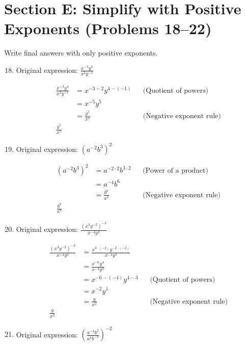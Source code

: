 \documentclass{article}
\begin{document}
\section*{Section E: Simplify with Positive Exponents (Problems 18--22)} 
Write final answers with only positive exponents.

\begin{enumerate}
\setcounter{enumi}{17}

\item
Original expression: \quad $\frac{x^{-3} y^4}{x^2 y^{-1}}$

\begin{align*}
\frac{x^{-3} y^4}{x^2 y^{-1}} &= x^{-3 - 2} y^{4 - (-1)} && \text{(Quotient of powers)} \\
&= x^{-5} y^{5} \\
&= \frac{y^{5}}{x^{5}} && \text{(Negative exponent rule)} \\
\boxed{\frac{y^{5}}{x^{5}}}
\end{align*}

\item
Original expression: \quad $(a^{-2} b^3)^2$

\begin{align*}
(a^{-2} b^3)^2 &= a^{-2 \cdot 2} b^{3 \cdot 2} && \text{(Power of a product)} \\
&= a^{-4} b^{6} \\
&= \frac{b^{6}}{a^{4}} && \text{(Negative exponent rule)} \\
\boxed{\frac{b^{6}}{a^{4}}}
\end{align*}

\item
Original expression: \quad $\frac{(x^3 y^{-2})^{-2}}{x^{-4} y^3}$

\begin{align*}
\frac{(x^3 y^{-2})^{-2}}{x^{-4} y^3} &= \frac{x^{3 \cdot (-2)} y^{-2 \cdot (-2)}}{x^{-4} y^{3}} \\
&= \frac{x^{-6} y^{4}}{x^{-4} y^{3}} \\
&= x^{-6 - (-4)} y^{4 - 3} && \text{(Quotient of powers)} \\
&= x^{-2} y^{1} \\
&= \frac{y}{x^{2}} && \text{(Negative exponent rule)} \\
\boxed{\frac{y}{x^{2}}}
\end{align*}

\item
Original expression: \quad $\left(\frac{a^{-1} b^2}{a^3 b^{-4}}\right)^{-2}$


\end{enumerate}
\end{document}
